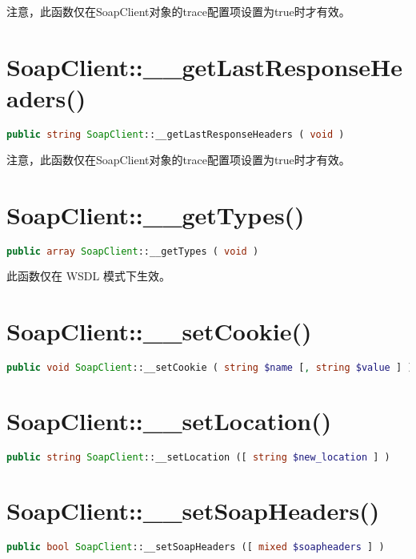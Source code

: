 注意，此函数仅在SoapClient对象的trace配置项设置为true时才有效。

\section{SoapClient::\_\_getLastResponseHeaders()}

\begin{lstlisting}[language=PHP]
public string SoapClient::__getLastResponseHeaders ( void )
\end{lstlisting}

注意，此函数仅在SoapClient对象的trace配置项设置为true时才有效。

\section{SoapClient::\_\_getTypes()}

\begin{lstlisting}[language=PHP]
public array SoapClient::__getTypes ( void )
\end{lstlisting}

此函数仅在 WSDL 模式下生效。

\section{SoapClient::\_\_setCookie()}



\begin{lstlisting}[language=PHP]
public void SoapClient::__setCookie ( string $name [, string $value ] )
\end{lstlisting}

\section{SoapClient::\_\_setLocation()}

\begin{lstlisting}[language=PHP]
public string SoapClient::__setLocation ([ string $new_location ] )
\end{lstlisting}

\section{SoapClient::\_\_setSoapHeaders()}

\begin{lstlisting}[language=PHP]
public bool SoapClient::__setSoapHeaders ([ mixed $soapheaders ] )
\end{lstlisting}

